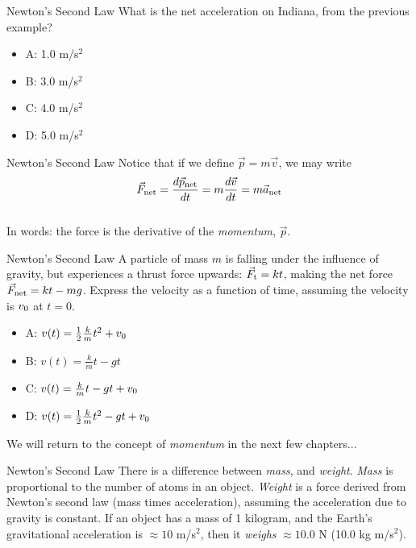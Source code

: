 \documentclass{beamer}
\begin{document}
\begin{frame}{Newton's Second Law}
What is the net acceleration on Indiana, from the previous example?
\begin{itemize}
\item A: 1.0 m/s$^2$
\item B: 3.0 m/s$^2$
\item C: 4.0 m/s$^2$
\item D: 5.0 m/s$^2$
\end{itemize}
\end{frame}

\begin{frame}{Newton's Second Law}
Notice that if we define $\vec{p} = m\vec{v}$, we may write \\
\vspace{0.5cm}
\begin{equation}
\vec{F}_{\rm net} = \frac{d\vec{p}_{\rm net}}{dt} = m \frac{d\vec{v}}{dt} = m \vec{a}_{\rm net}
\end{equation} \\
\vspace{0.5cm}
In words: the force is the derivative of the \textit{momentum}, $\vec{p}$.
\end{frame}

\begin{frame}{Newton's Second Law}
A particle of mass $m$ is falling under the influence of gravity, but experiences a thrust force upwards: $\vec{F}_{\rm t} = kt$, making the net force $\vec{F}_{\rm net} = kt - mg$.  Express the velocity as a function of time, assuming the velocity is $v_{\rm 0}$ at $t=0$.
\begin{itemize}
\item A: $v(t) = \frac{1}{2} \frac{k}{m} t^2+v_{\rm 0}$
\item B:  $v(t) = \frac{k}{m} t - gt$
\item C:  $v(t) = \frac{k}{m} t - gt +v_{\rm 0}$
\item D: $v(t) = \frac{1}{2} \frac{k}{m} t^2 - gt +v_{\rm 0}$
\end{itemize}
\vspace{0.5cm}
We will return to the concept of \textit{momentum} in the next few chapters...
\end{frame}

\begin{frame}{Newton's Second Law}
There is a difference between \alert{\textit{mass}}, and \alert{\textit{weight}}.  \textit{Mass} is proportional to the number of atoms in an object.  \textit{Weight} is a force derived from Newton's second law (mass times acceleration), assuming the acceleration due to gravity is constant.  If an object has a mass of 1 kilogram, and the Earth's gravitational acceleration is $\approx 10$ m/s$^2$, then it \textit{weighs} $\approx 10.0$ N (10.0 kg m/s$^2$).
\end{frame}
\end{document}
